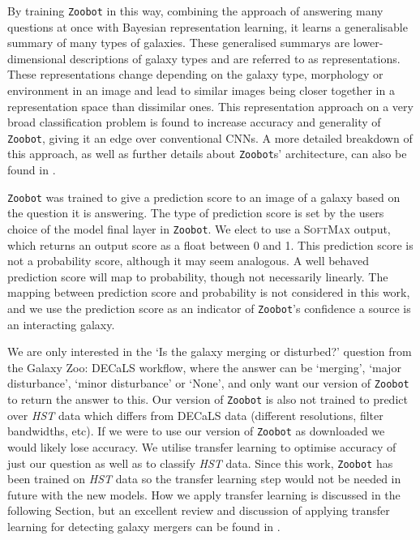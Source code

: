 By training \texttt{Zoobot} in this way, combining the approach of answering many questions at once with Bayesian representation learning, it learns a generalisable summary of many types of galaxies. These generalised summarys are lower-dimensional descriptions of galaxy types and are referred to as representations. These representations change depending on the galaxy type, morphology or environment in an image and lead to similar images being closer together in a representation space than dissimilar ones. This representation approach on a very broad classification problem is found to increase accuracy and generality of \texttt{Zoobot}, giving it an edge over conventional CNNs. A more detailed breakdown of this approach, as well as further details about \texttt{Zoobot}s' architecture, can also be found in \citet{2022MNRAS.509.3966W}.

\texttt{Zoobot} was trained to give a prediction score to an image of a galaxy based on the question it is answering. The type of prediction score is set by the users choice of the model final layer in \texttt{Zoobot}. We elect to use a \textsc{SoftMax} output, which returns an output score as a float between 0 and 1. This prediction score is not a probability score, although it may seem analogous. A well behaved prediction score will map to probability, though not necessarily linearly. The mapping between prediction score and probability is not considered in this work, and we use the prediction score as an indicator of \texttt{Zoobot}'s confidence a source is an interacting galaxy. 

We are only interested in the `Is the galaxy merging or disturbed?' question from the Galaxy Zoo: DECaLS workflow, where the answer can be `merging', `major disturbance', `minor disturbance' or `None', and only want our version of \texttt{Zoobot} to return the answer to this. Our version of \texttt{Zoobot} is also not trained to predict over \emph{HST} data which differs from DECaLS data (different resolutions, filter bandwidths, etc). If we were to use our version of \texttt{Zoobot} as downloaded we would likely lose accuracy. We utilise transfer learning to optimise accuracy of just our question as well as to classify \emph{HST} data. Since this work, \texttt{Zoobot} has been trained on \emph{HST} data so the transfer learning step would not be needed in future with the new models. How we apply transfer learning is discussed in the following Section, but an excellent review and discussion of applying transfer learning for detecting galaxy mergers can be found in \citet{2018MNRAS.479..415A}.

